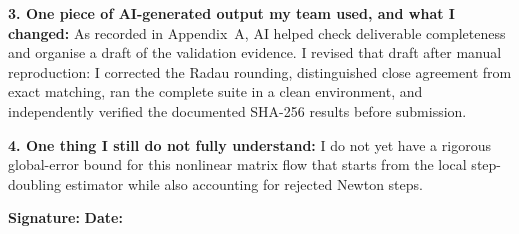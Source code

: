 \documentclass[10pt]{article}
\begin{document}
\begin{formbox}
\textbf{3. One piece of AI-generated output my team used, and what I changed:}
As recorded in Appendix~A, AI helped check deliverable completeness and
organise a draft of the validation evidence.  I revised that draft after manual
reproduction: I corrected the Radau rounding, distinguished close agreement
from exact matching, ran the complete suite in a clean environment, and
independently verified the documented SHA-256 results before submission.

\textbf{4. One thing I still do not fully understand:} I do not yet have a
rigorous global-error bound for this nonlinear matrix flow that starts from the
local step-doubling estimator while also accounting for rejected Newton steps.

\vfill
\textbf{Signature:} \underline{\hspace{4.5cm}} \hfill
\textbf{Date:} \underline{\hspace{2.5cm}}
\end{formbox}
\end{document}
